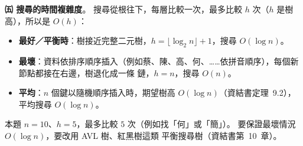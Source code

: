 \begin{pastsoln}
\textbf{㈤ 搜尋的時間複雜度}。 搜尋從根往下，每層比較一次，最多比較 $h$ 次（$h$ 是樹高），所以是 $O(h)$：
\begin{itemize}
\item \textbf{最好／平衡時}：樹接近完整二元樹，$h = \lfloor \log_2 n \rfloor + 1$，搜尋 $O(\log n)$。
\item \textbf{最壞}：資料依排序順序插入（例如蔡、陳、高、何、……依拼音順序），每個新節點都接在右邊，樹退化成一條
鏈，$h = n$，搜尋 $O(n)$。
\item \textbf{平均}：$n$ 個鍵以隨機順序插入時，期望樹高 $O(\log n)$（資結書定理~9.2），平均搜尋 $O(\log n)$。
\end{itemize}
本題 $n = 10$、$h = 5$，最多比較 $5$ 次（例如找「何」或「簡」）。 要保證最壞情況 $O(\log n)$，要改用 AVL 樹、紅黑樹這類
平衡搜尋樹（資結書第~10~章）。
\end{pastsoln}
